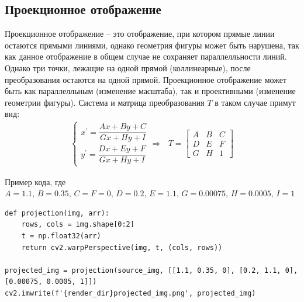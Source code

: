 \documentclass[a4paper, 16pt]{article}
\begin{document}
\subsection{Проекционное отображение}
\noindent Проекционное отображение -- это отображение, при котором прямые линии
остаются прямыми линиями, однако геометрия фигуры может быть нарушена, так как 
данное отображение в общем случае не сохраняет параллелльности линий. Однако три точки,
лежащие на одной прямой (коллинеарные), после преобразования остаются на одной прямой.
Проекционное отображение может быть как параллелльным (изменение масштаба), так и 
проективными (изменение геометрии фигуры). Система и матрица преобразования $T$ в
таком случае примут вид:
\begin{align*}
    \begin{cases}
        x^{\prime}=\dfrac{Ax+By+C}{Gx+Hy+I}\\
        y^{\prime}=\dfrac{Dx+Ey+F}{Gx+Hy+I}
    \end{cases}\Rightarrow\,\,\,\,
    T=
    \begin{bmatrix}
        A &B &C\\
        D &E &F\\
        G &H &1
    \end{bmatrix}
\end{align*}


\noindent Пример кода, где $A=1.1,\,B=0.35,\,C=F=0,\,D=0.2,\,E=1.1,\,G=0.00075,\,H=0.0005,\,I=1$
\begin{lstlisting}[label=projection-code,caption=Код для проективного отображения]
def projection(img, arr):
    rows, cols = img.shape[0:2]
    t = np.float32(arr)
    return cv2.warpPerspective(img, t, (cols, rows))

projected_img = projection(source_img, [[1.1, 0.35, 0], [0.2, 1.1, 0], [0.00075, 0.0005, 1]])
cv2.imwrite(f'{render_dir}projected_img.png', projected_img)
\end{lstlisting}
\end{document}
